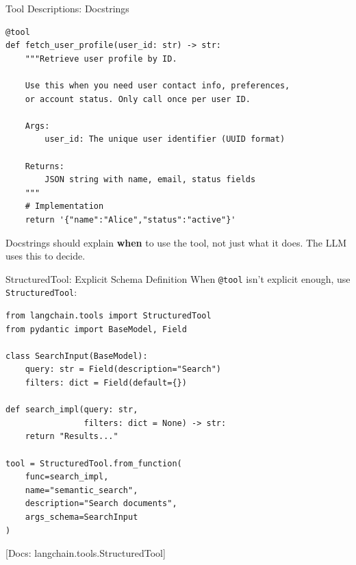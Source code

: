 \documentclass[aspectratio=169,11pt]{beamer}
\newcommand{\docref}[1]{{\scriptsize\color{docgray}[Docs: #1]}}
\begin{document}
\begin{frame}[fragile]{Tool Descriptions: Docstrings}
\begin{codebox}
\begin{lstlisting}
@tool
def fetch_user_profile(user_id: str) -> str:
    """Retrieve user profile by ID.

    Use this when you need user contact info, preferences,
    or account status. Only call once per user ID.

    Args:
        user_id: The unique user identifier (UUID format)

    Returns:
        JSON string with name, email, status fields
    """
    # Implementation
    return '{"name":"Alice","status":"active"}'
\end{lstlisting}
\end{codebox}

\begin{tipbox}
Docstrings should explain \textbf{when} to use the tool, not just what it does. The LLM uses this to decide.
\end{tipbox}
\end{frame}

\begin{frame}[fragile]{StructuredTool: Explicit Schema Definition}
When \texttt{@tool} isn't explicit enough, use \texttt{StructuredTool}:

\begin{codebox}
\begin{lstlisting}
from langchain.tools import StructuredTool
from pydantic import BaseModel, Field

class SearchInput(BaseModel):
    query: str = Field(description="Search")
    filters: dict = Field(default={})

def search_impl(query: str,
                filters: dict = None) -> str:
    return "Results..."

tool = StructuredTool.from_function(
    func=search_impl,
    name="semantic_search",
    description="Search documents",
    args_schema=SearchInput
)
\end{lstlisting}
\end{codebox}

\textcolor{docgray}{\docref{langchain.tools.StructuredTool}}
\end{frame}
\end{document}
